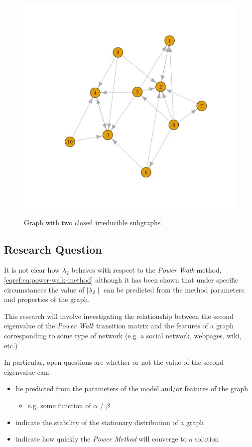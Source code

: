 \documentclass[11pt]{article}
\begin{document}
\begin{figure}[htbp]
\centering
\includegraphics[width=.9\linewidth]{two-sub-graph-fig2.png}
\caption{\label{two-sub-graph}Graph with two closed irreducible subgraphs}
\end{figure}

\subsection{Research Question}
\label{research-question}
It is not clear how \(\lambda_{2}\) behaves with respect to the \emph{Power Walk} method, \eqref{eqref:eq:power-walk-method} although it has been shown that under specific circumstances the value of \(\mid \lambda_{2}\mid\) can be predicted from the method parameters and properties of the graph. \cite[]{parkPowerWalkProceedings2013}

This research will involve investigating the relationship between the second eigenvalue of the \emph{Power Walk} transition matrix and the features of a graph corresponding to some type of network (e.g. a social network, webpages, wiki, etc.)

In particular, open questions are whether or not the value of the second eigenvalue can:

\begin{itemize}
\item be predicted from the parameters of the model and/or features of the graph
\begin{itemize}
\item e.g. some function of \(\alpha\) / \(\beta\)
\end{itemize}
\item indicate the stability of the stationary distribution of a graph
\item indicate how quickly the \emph{Power Method} will converge to a solution
\end{itemize}
\end{document}
